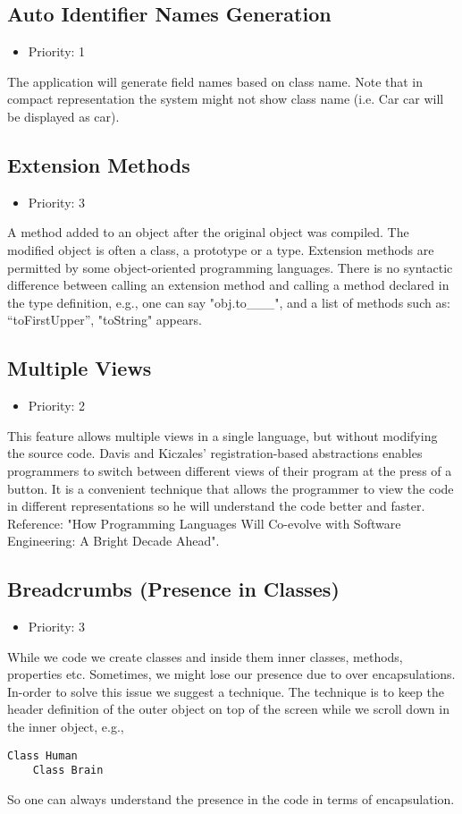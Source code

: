 \subsection{Auto Identifier Names Generation}
\begin{itemize}
	\item Priority: 1
\end{itemize}
The application will generate field names based on class name. Note that in compact representation the system might not show class name (i.e. Car car will be displayed as car).
\subsection{Extension Methods}
\begin{itemize}
	\item Priority: 3
\end{itemize}
A method added to an object after the original object was compiled. The modified object is often a class, a prototype or a type. Extension methods are permitted by some object-oriented programming languages. There is no syntactic difference between calling an extension method and calling a method declared in the type definition, e.g., one can say "obj.to\_\_\_", and a list of methods such as: “toFirstUpper”, "toString" appears.
\subsection{Multiple Views}
\begin{itemize}
	\item Priority: 2
\end{itemize}
This feature allows multiple views in a single language, but without modifying the source code. Davis and Kiczales’ registration-based abstractions enables programmers to switch between different views of their program at the press of a button. It is a convenient technique that allows the programmer to view the code in different representations so he will understand the code better and faster. Reference: "How Programming Languages Will Co-evolve with Software Engineering: A Bright Decade Ahead".
\subsection{Breadcrumbs (Presence in Classes)}
\begin{itemize}
	\item Priority: 3
\end{itemize}
While we code we create classes and inside them inner classes, methods, properties etc. Sometimes, we might lose our presence due to over encapsulations. In-order to solve this issue we suggest a technique. The technique is to keep the header definition of the outer object on top of the screen while we scroll down in the inner object, e.g., 
\begin{lstlisting}
Class Human
	Class Brain
\end{lstlisting}
So one can always understand the presence in the code in terms of encapsulation.
